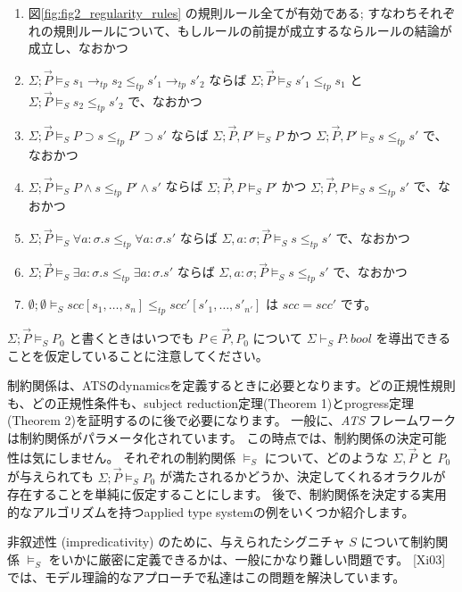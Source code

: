 \documentclass[submit,techreq,noauthor,onecolumn]{ipsj}
\begin{document}
\begin{enumerate}
  \item 図\ref{fig:fig2_regularity_rules} の規則ルール全てが有効である; すなわちそれぞれの規則ルールについて、もしルールの前提が成立するならルールの結論が成立し、なおかつ
  \item $\Sigma; \vec{P} \models_S s_1 \rightarrow_{tp} s_2 \leq_{tp} s'_1 \rightarrow_{tp} s'_2$ ならば $\Sigma; \vec{P} \models_S s'_1 \leq_{tp} s_1$ と $\Sigma; \vec{P} \models_S s_2 \leq_{tp} s'_2$ で、なおかつ
  \item $\Sigma; \vec{P} \models_S P \supset s \leq_{tp} P' \supset s'$ ならば $\Sigma; \vec{P},P' \models_S P$ かつ $\Sigma; \vec{P},P' \models_S s \leq_{tp} s'$ で、なおかつ
  \item $\Sigma; \vec{P} \models_S P \wedge s \leq_{tp} P' \wedge s'$ ならば $\Sigma; \vec{P},P \models_S P'$ かつ $\Sigma; \vec{P},P \models_S s \leq_{tp} s'$ で、なおかつ
  \item $\Sigma; \vec{P} \models_S \forall a : \sigma.s \leq_{tp} \forall a : \sigma.s'$ ならば $\Sigma , a: \sigma; \vec{P} \models_S s \leq_{tp} s'$ で、なおかつ
  \item $\Sigma; \vec{P} \models_S \exists a : \sigma.s \leq_{tp} \exists a : \sigma.s'$ ならば $\Sigma , a: \sigma; \vec{P} \models_S s \leq_{tp} s'$ で、なおかつ
  \item $\emptyset; \emptyset \models_S scc[s_1,\ldots,s_n] \leq_{tp} scc'[s'_1,\ldots,s'_{n'}]$ は $scc = scc'$ です。
\end{enumerate}

\noindent $\Sigma; \vec{P} \models_S P_0$ と書くときはいつでも $P \in \vec{P},P_0$ について $\Sigma \vdash_S P : bool$ を導出できることを仮定していることに注意してください。

\noindent 制約関係は、ATSのdynamicsを定義するときに必要となります。どの正規性規則も、どの正規性条件も、subject reduction定理(Theorem 1)とprogress定理(Theorem 2)を証明するのに後で必要になります。
一般に、{\it ATS} フレームワークは制約関係がパラメータ化されています。
この時点では、制約関係の決定可能性は気にしません。
それぞれの制約関係 $\models_S$ について、どのような $\Sigma, \vec{P}$ と $P_0$ が与えられても $\Sigma; \vec{P} \models_S P_0$ が満たされるかどうか、決定してくれるオラクルが存在することを単純に仮定することにします。
後で、制約関係を決定する実用的なアルゴリズムを持つapplied type systemの例をいくつか紹介します。

非叙述性 (impredicativity) のために、与えられたシグニチャ $S$ について制約関係 $\models_S$ をいかに厳密に定義できるかは、一般にかなり難しい問題です。
[Xi03] では、モデル理論的なアプローチで私達はこの問題を解決しています。
\end{document}
